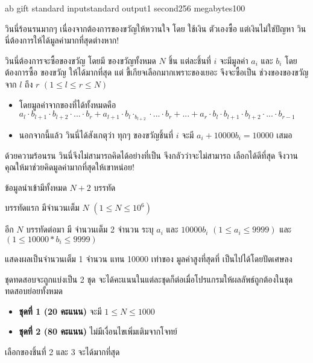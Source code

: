 \documentclass[11pt,a4paper]{article}
\begin{document}
\begin{problem}{ab gift }{standard input}{standard output}{1 second}{256 megabytes}{100}

วินนี่ร้อนรนมากๆ เนื่องจากต้องการของขวัญให้หวานใจ โดย ใช้เงิน ตัวเองซื้อ แต่เงินไม่ใช่ปัญหา วินนี่ต้องการให้ได้มูลค่ามากที่สุดต่างหาก!

วินนี่ต้องการจะซื้อของขวัญ โดยมี ของขวัญทั้งหมด $N$ ชิ้น แต่ละชิ้นที่ $i$ จะมีมูลค่า $a_i$ และ  $b_i$
โดยต้องการซื้อ ของขวัญ ให้ได้มากที่สุด แต่ ขี้เกียจเลือกมากเพราะของเยอะ จึงจะซื้อเป็น ช่วงของของขวัญจาก $l$ ถึง $r$ $( 1 \leq l \leq r \leq N )$ 
\begin{itemize}

\item โดยมูลค่าจากของที่ได้ทั้งหมดคือ  $a_l \cdot b_{l+1} \cdot b_{l+2} \cdot ... \cdot b_r +
a_{l+1} \cdot b_l \cdot _b_{l+2} \cdot ... \cdot b_r +...+ a_r \cdot b_l \cdot b_{l+1} \cdot b_{l+2} \cdot ... \cdot b_{r-1}$ 
\item นอกจากนี้แล้ว วินนี่ได้สังเกตุว่า ทุกๆ ของขวัญชิ้นที่ $i$ จะมี $a_i+10000b_i = 10000$ เสมอ
\end{itemize}

ด้วยความร้อนรน วินนี่จึงไม่สามารถคิดได้อย่างที่เป็น จึงกลัวว่าจะไม่สามารถ เลือกได้ดีที่สุด จึงวานคุณให้มาช่วยคิดมูลค่ามากที่สุดให้เขาหน่อย! 

\InputFile
ข้อมูลนำเข้ามีทั้งหมด $N+2$ บรรทัด

บรรทัดแรก มีจำนวนเต็ม $N$ $( 1 \leq N \leq 10^6 )$ 

อีก $N$ บรรทัดต่อมา มี จำนวนเต็ม 2 จำนวน ระบุ $a_i$ และ $10000b_i$
$( 1 \leq a_i \leq 9999 )$ และ $( 1 \leq 10000 * b_i \leq 9999 ) $

\OutputFile
แสดงผลเป็นจำนวนเต็ม 1 จำนวน แทน 10000 เท่าของ มูลค่าสูงที่สุดที่ เป็นไปได้โดยปัดเศษลง

\Scoring
ชุดทดสอบจะถูกแบ่งเป็น 2 ชุด จะได้คะแนนในแต่ละชุดก็ต่อเมื่อโปรแกรมให้ผลลัพธ์ถูกต้องในชุดทดสอบย่อยทั้งหมด

\begin{itemize}

\item \textbf{ชุดที่ 1  (20 คะแนน)} จะมี $1 \leq N \leq 1000$

\item \textbf{ชุดที่ 2 (80 คะแนน)} ไม่มีเงื่อนไขเพิ่มเติมจากโจทย์

\end{itemize}

\Example

\begin{example}
%
\end{example}

\Note

เลือกของชิ้นที่ 2 และ 3 จะได้มากที่สุด

\end{problem}
\end{document}

